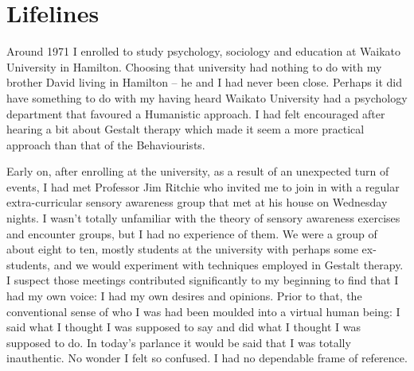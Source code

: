 \chapter{Lifelines}

Around 1971 I enrolled to study psychology, sociology and education at
Waikato University in Hamilton. Choosing that university had nothing to
do with my brother David living in Hamilton -- he and I had never been
close. Perhaps it did have something to do with my having heard Waikato
University had a psychology department that favoured a Humanistic
approach. I had felt encouraged after hearing a bit about Gestalt
therapy which made it seem a more practical approach than that of the
Behaviourists.

Early on, after enrolling at the university, as a result of an
unexpected turn of events, I had met Professor Jim Ritchie who invited
me to join in with a regular extra-curricular sensory awareness group
that met at his house on Wednesday nights. I wasn't totally unfamiliar
with the theory of sensory awareness exercises and encounter groups, but
I had no experience of them. We were a group of about eight to ten,
mostly students at the university with perhaps some ex-students, and we
would experiment with techniques employed in Gestalt therapy. I suspect
those meetings contributed significantly to my beginning to find that I
had my own voice: I had my own desires and opinions. Prior to that, the
conventional sense of who I was had been moulded into a virtual human
being: I said what I thought I was supposed to say and did what I
thought I was supposed to do. In today's parlance it would be said that
I was totally inauthentic. No wonder I felt so confused. I had no
dependable frame of reference.


